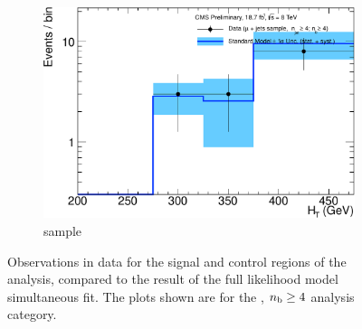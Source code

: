 \begin{figure}[h!]
\begin{subfigure}[b]{0.48\textwidth}
    \includegraphics[width=\textwidth]
    {Figs/results/v0/blueBand/single_plots/muon_ge4b_ge4j_logy.pdf}
    \caption{\mj sample}
  \end{subfigure}
  \caption{Observations in data for the signal and control
  regions of the analysis, compared to the result of the full likelihood model
  simultaneous fit. The plots shown are for the \njhigh, $n_{\text{b}} \geq 4$ analysis category.}
  \label{fig:blue_fits_ge4b_ge4j}
\end{figure}
